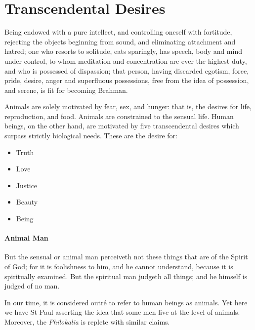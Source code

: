 \section{Transcendental Desires}

\begin{quotex}
Being endowed with a pure intellect, and controlling oneself with fortitude, rejecting the objects beginning from sound, and eliminating attachment and hatred; one who resorts to solitude, eats sparingly, has speech, body and mind under control, to whom meditation and concentration are ever the highest duty, and who is possessed of dispassion; that person, having discarded egotism, force, pride, desire, anger and superfluous possessions, free from the idea of possession, and serene, is fit for becoming Brahman.
\end{quotex}


Animals are solely motivated by fear, sex, and hunger: that is, the desires for life, reproduction, and food. Animals are constrained to the sensual life. Human beings, on the other hand, are motivated by five transcendental desires which surpass strictly biological needs. These are the desire for:

\begin{itemize}


\item Truth

\item Love

\item Justice

\item Beauty

\item Being
\end{itemize}


\paragraph{Animal Man}


\begin{quotex}
But the sensual or animal man perceiveth not these things that are of the Spirit of God; for it is foolishness to him, and he cannot understand, because it is spiritually examined. But the spiritual man judgeth all things; and he himself is judged of no man.
\end{quotex}


In our time, it is considered outré to refer to human beings as animals. Yet here we have St Paul asserting the idea that some men live at the level of animals. Moreover, the \emph{Philokalia} is replete with similar claims.

